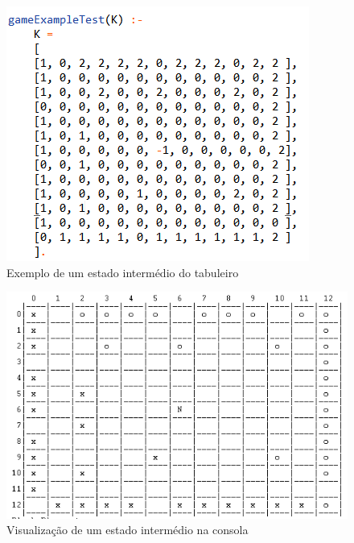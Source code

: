 \documentclass[a4paper]{article}
\begin{document}
\begin{figure}
\begin{center}
\includegraphics[scale=0.8]{gamemiddle.png}
\caption{Exemplo de um estado intermédio do tabuleiro}
\end{center}
\end{figure}

\begin{figure}
\begin{center}
\hspace*{-0.1cm}\includegraphics[scale=0.8]{gamemiddleboard.png}
\caption{Visualização de um estado intermédio na consola}
\end{center}
\end{figure}
\end{document}

